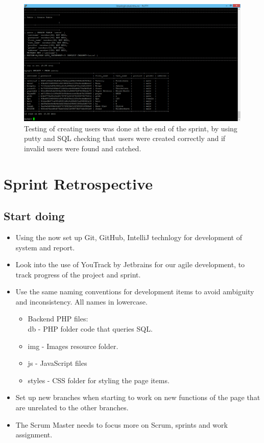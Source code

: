\begin{figure}[ht!]
\centering
\includegraphics[width={\linewidth}]{Sprint2/img/Sprint2-testing.png}
\caption{ Testing of creating users was done at the end of the sprint, by using putty and SQL checking that users were created correctly and if invalid users were found and catched. \label{overflow}}
\end{figure}

\section{Sprint Retrospective} 
\label{sec:S2Retrospective}


\subsection{Start doing}
\label{subsec:S2RetrospectiveStart}
\begin{itemize}
\item Using the now set up Git, GitHub, IntelliJ technlogy for development of system and report.
\item Look into the use of YouTrack by Jetbrains for our agile development, to track progress of the project and sprint. 
\item Use the same naming conventions for development items to avoid ambiguity and inconsistency. All names in lowercase. 
\begin{itemize}
\item Backend PHP files: \\ db - PHP folder code that queries SQL. 
\item img - Images resource folder. 
\item js - JavaScript files
\item styles - CSS folder for styling the page items. 
\end{itemize}
\item Set up new branches when starting to work on new functions of the page that are unrelated to the other branches. 
\item The Scrum Master needs to focus more on Scrum, sprints and work assignment.
\end{itemize}

